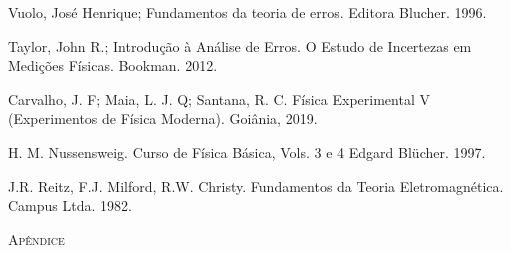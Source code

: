 \documentclass{article}
\begin{document}
\begin{thebibliography}{99}
    Vuolo, Jos{\'e} Henrique;
    Fundamentos da teoria de erros.
    Editora Blucher.
    1996.
    
    Taylor, John R.;
    Introdução à Análise de Erros. O Estudo de Incertezas em Medições Físicas.
    Bookman.
    2012.
    
    Carvalho, J. F; Maia, L. J. Q; Santana, R. C.
    Física Experimental V (Experimentos de Física Moderna).
    Goiânia, 2019.
    
    H. M. Nussensweig. 
    Curso de Física Básica, Vols. 3 e 4
    Edgard Blücher.
    1997. 
    
    J.R. Reitz, F.J. Milford, R.W. Christy.
    Fundamentos da Teoria Eletromagnética.
    Campus Ltda. 
    1982. 

\end{thebibliography}

\newpage
\Large\textsc{{Apêndice}}
\end{document}
